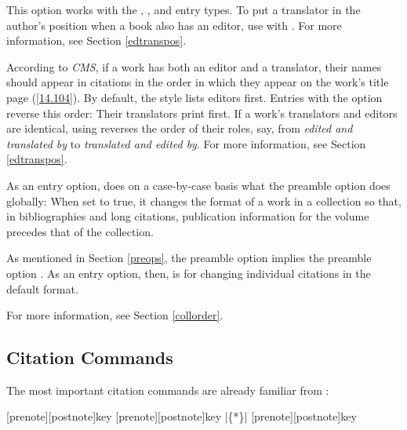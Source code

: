 \documentclass[11pt,letterpaper,oneside]{article}
\begin{document}
\begin{optionlist}
\noindent This option works with the ,
, and  entry types. To put a
translator in the author's position when a book also has an editor,
use  with . For more information, see
Section \ref{edtranspos}.


\noindent According to \textit{CMS}, if a work has both an editor and
a translator, their names should appear in citations in the order in
which they appear on the work's title page (\ref{14.104}). By default,
the style lists editors first. Entries with the option
 reverse this order: Their translators print
first. If a work's translators and editors are identical, using
 reverses the order of their roles, say, from
\textit{edited and translated by} to \textit{translated and edited
by}. For more information, see Section \ref{edtranspos}.


As an entry option,  does on a case-by-case basis what
the  preamble option does globally: When set to true, it
changes the format of a work in a collection so that, in
bibliographies and long citations, publication information for the
volume precedes that of the collection.

As mentioned in Section \ref{preops}, the preamble option
 implies the preamble option . As an entry
option, then,  is for changing individual citations in
the default format.

For more information, see Section \ref{collorder}.

\end{optionlist}

\subsection{Citation Commands}
\label{citecmds}

The most important citation commands are already familiar from
\biblatex:

\begin{ltxsyntax}
[prenote][postnote]{key}
[prenote][postnote]{key}
|\{*\}|
[prenote][postnote]{key}
\end{ltxsyntax}
\end{document}
